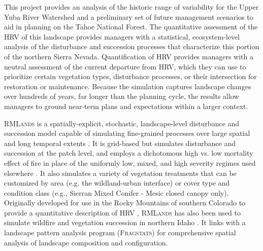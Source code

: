 This project provides an analysis of the historic range of variability for the Upper Yuba River Watershed and a preliminary set of future management scenarios to aid in planning on the Tahoe National Forest. The quantitative assessment of the HRV of this landscape provides managers with a statistical, ecosystem-level analysis of the disturbance and succession processes that characterize this portion of the northern Sierra Nevada. Quantification of HRV provides managers with a neutral assessment of the current departure from HRV, which they can use to prioritize certain vegetation types, disturbance processes, or their intersection for restoration or maintenance. Because the simulation captures landscape changes over hundreds of years, far longer than the planning cycle, the results allow managers to ground near-term plans and expectations within a larger context. 

\textsc{RMLands} is a spatially-explicit, stochastic, landscape-level disturbance and succession model capable of simulating fine-grained processes over large spatial and long temporal extents \citep{McGarigal2005}. It is grid-based but simulates disturbance and succession at the patch level, and employs a dichotomous high vs. low mortality effect of fire in place of the uniformly low, mixed, and high severity regimes used elsewhere \citep{McGarigal2012}. It also simulates a variety of vegetation treatments that can be customized by area (e.g. the wildland-urban interface) or cover type and condition class (e.g., Sierran Mixed Conifer - Mesic closed canopy only). Originally developed for use in the Rocky Mountains of southern Colorado to provide a quantitative description of HRV \citep{McGarigal2012}, \textsc{RMLands} has also been used to simulate wildfire and vegetation succession in northern Idaho \citep{Cushman2011}. It links with a landscape pattern analysis program (\textsc{Fragstats}) for comprehensive spatial analysis of landscape composition and configuration.  


